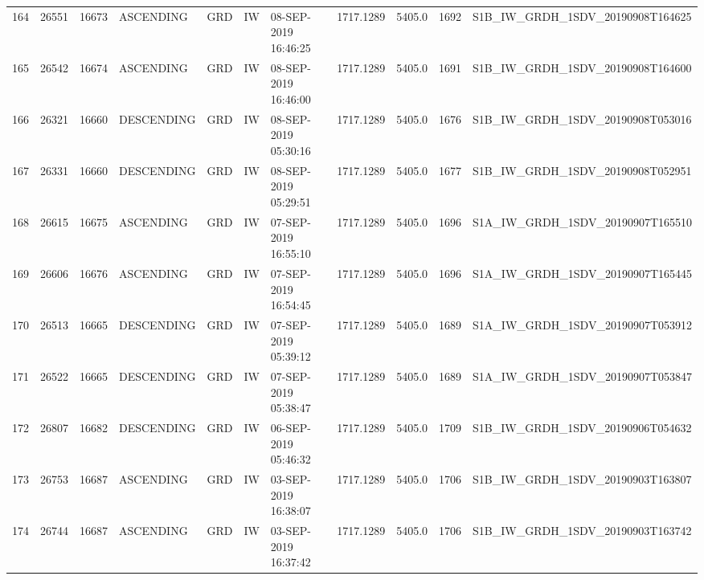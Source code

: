 \begin{tabular}{lrrllllllll}
164 &  26551 &   16673 &   ASCENDING &          GRD &              IW &  08-SEP-2019 16:46:25 &                  1717.1289 &          5405.0 &       1692 &  S1B\_IW\_GRDH\_1SDV\_20190908T164625 \\
165 &  26542 &   16674 &   ASCENDING &          GRD &              IW &  08-SEP-2019 16:46:00 &                  1717.1289 &          5405.0 &       1691 &  S1B\_IW\_GRDH\_1SDV\_20190908T164600 \\
166 &  26321 &   16660 &  DESCENDING &          GRD &              IW &  08-SEP-2019 05:30:16 &                  1717.1289 &          5405.0 &       1676 &  S1B\_IW\_GRDH\_1SDV\_20190908T053016 \\
167 &  26331 &   16660 &  DESCENDING &          GRD &              IW &  08-SEP-2019 05:29:51 &                  1717.1289 &          5405.0 &       1677 &  S1B\_IW\_GRDH\_1SDV\_20190908T052951 \\
168 &  26615 &   16675 &   ASCENDING &          GRD &              IW &  07-SEP-2019 16:55:10 &                  1717.1289 &          5405.0 &       1696 &  S1A\_IW\_GRDH\_1SDV\_20190907T165510 \\
169 &  26606 &   16676 &   ASCENDING &          GRD &              IW &  07-SEP-2019 16:54:45 &                  1717.1289 &          5405.0 &       1696 &  S1A\_IW\_GRDH\_1SDV\_20190907T165445 \\
170 &  26513 &   16665 &  DESCENDING &          GRD &              IW &  07-SEP-2019 05:39:12 &                  1717.1289 &          5405.0 &       1689 &  S1A\_IW\_GRDH\_1SDV\_20190907T053912 \\
171 &  26522 &   16665 &  DESCENDING &          GRD &              IW &  07-SEP-2019 05:38:47 &                  1717.1289 &          5405.0 &       1689 &  S1A\_IW\_GRDH\_1SDV\_20190907T053847 \\
172 &  26807 &   16682 &  DESCENDING &          GRD &              IW &  06-SEP-2019 05:46:32 &                  1717.1289 &          5405.0 &       1709 &  S1B\_IW\_GRDH\_1SDV\_20190906T054632 \\
173 &  26753 &   16687 &   ASCENDING &          GRD &              IW &  03-SEP-2019 16:38:07 &                  1717.1289 &          5405.0 &       1706 &  S1B\_IW\_GRDH\_1SDV\_20190903T163807 \\
174 &  26744 &   16687 &   ASCENDING &          GRD &              IW &  03-SEP-2019 16:37:42 &                  1717.1289 &          5405.0 &       1706 &  S1B\_IW\_GRDH\_1SDV\_20190903T163742 \\
\bottomrule
\end{tabular}

